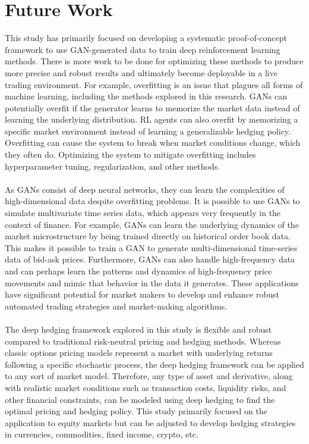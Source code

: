 \section{Future Work}
This study has primarily focused on developing a systematic proof-of-concept framework to use GAN-generated data to train deep reinforcement learning methods. There is more work to be done for optimizing these methods to produce more precise and robust results and ultimately become deployable in a live trading environment. For example, overfitting is an issue that plagues all forms of machine learning, including the methods explored in this research. GANs can potentially overfit if the generator learns to memorize the market data instead of learning the underlying distribution. RL agents can also overfit by memorizing a specific market environment instead of learning a generalizable hedging policy. Overfitting can cause the system to break when market conditions change, which they often do. Optimizing the system to mitigate overfitting includes hyperparameter tuning, regularization, and other methods.
\\ \\
As GANs consist of deep neural networks, they can learn the complexities of high-dimensional data despite overfitting problems. It is possible to use GANs to simulate multivariate time series data, which appears very frequently in the context of finance. For example, GANs can learn the underlying dynamics of the market microstructure by being trained directly on historical order book data. This makes it possible to train a GAN to generate multi-dimensional time-series data of bid-ask prices. Furthermore, GANs can also handle high-frequency data and can perhaps learn the patterns and dynamics of high-frequency price movements and mimic that behavior in the data it generates. These applications have significant potential for market makers to develop and enhance robust automated trading strategies and market-making algorithms.
\\ \\
The deep hedging framework explored in this study is flexible and robust compared to traditional risk-neutral pricing and hedging methods. Whereas classic options pricing models represent a market with underlying returns following a specific stochastic process, the deep hedging framework can be applied to any sort of market model. Therefore, any type of asset and derivative, along with realistic market conditions such as transaction costs, liquidity risks, and other financial constraints, can be modeled using deep hedging to find the optimal pricing and hedging policy. This study primarily focused on the application to equity markets but can be adjusted to develop hedging strategies in currencies, commodities, fixed income, crypto, etc.
